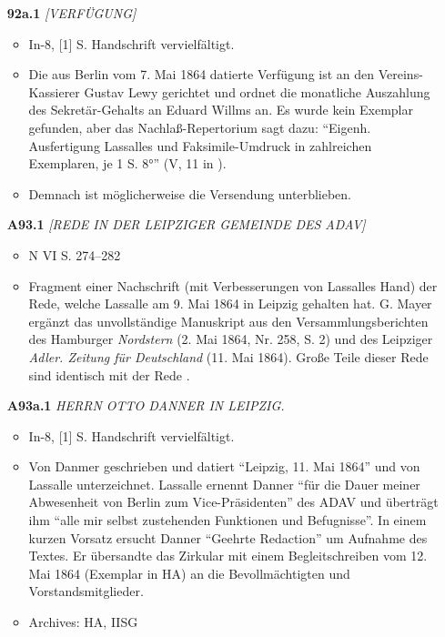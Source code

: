 \begin{itemize}
    \item[\textbf{92a.1}] \textit{[VERFÜGUNG]}
    \begin{itemize}
        \item In-8, [1] S. Handschrift vervielfältigt.
        \item Die aus Berlin vom 7. Mai 1864 datierte Verfügung ist an den Vereins-Kassierer Gustav Lewy gerichtet und ordnet die monatliche Auszahlung des Sekretär-Gehalts an Eduard Willms an. Es wurde kein Exemplar gefunden, aber das Nachlaß-Repertorium sagt dazu: ``Eigenh. Ausfertigung Lassalles und Faksimile-Umdruck in zahlreichen Exemplaren, je 1 S. 8°'' (V, 11 in ).
        \item Demnach ist möglicherweise die Versendung unterblieben.
    \end{itemize}
    
    \item[\textbf{A93.1}] \textit{[REDE IN DER LEIPZIGER GEMEINDE DES ADAV]}
    \begin{itemize}
        \item N VI S. 274--282
        \item Fragment einer Nachschrift (mit Verbesserungen von Lassalles Hand) der Rede, welche Lassalle am 9. Mai 1864 in Leipzig gehalten hat. G. Mayer ergänzt das unvollständige Manuskript aus den Versammlungsberichten des Hamburger \textit{Nordstern} (2. Mai 1864, Nr. 258, S. 2) und des Leipziger \textit{Adler. Zeitung für Deutschland} (11. Mai 1864). Große Teile dieser Rede sind identisch mit der Rede .
    \end{itemize}
    
    \item[\textbf{A93a.1}] \textit{HERRN OTTO DANNER IN LEIPZIG.}
    \begin{itemize}
        \item  In-8, [1] S. Handschrift vervielfältigt.
        \item Von Danmer geschrieben und datiert ``Leipzig, 11. Mai 1864'' und von Lassalle unterzeichnet. Lassalle ernennt Danner ``für die Dauer meiner Abwesenheit von Berlin zum Vice-Präsidenten'' des ADAV und überträgt ihm ``alle mir selbst zustehenden Funktionen und Befugnisse''. In einem kurzen Vorsatz ersucht Danner ``Geehrte Redaction'' um Aufnahme des Textes. Er übersandte das Zirkular mit einem Begleitschreiben vom 12. Mai 1864 (Exemplar in HA) an die Bevollmächtigten und Vorstandsmitglieder.
        \item Archives: HA, IISG
    \end{itemize}
    

\end{itemize}
